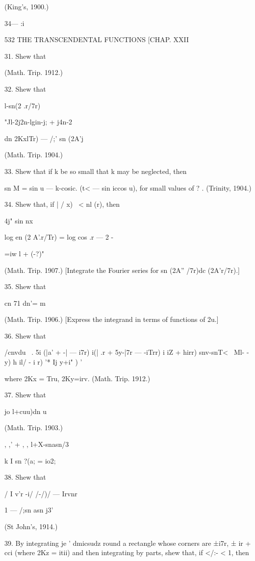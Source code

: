 (King's, 1900.)

34— :i



532 THE TRANSCENDENTAL FUNCTIONS [CHAP. XXII

31. Shew that

(Math. Trip. 1912.)

32. Shew that

l-sn(2 .r/7r)



"Jl-2j2n-lgin-j; + j4n-2



 dn 2KxlTr) — /;' sn (2A'j

(Math. Trip. 1904.)

33. Shew that if k be so small that k may be neglected, then

sn M = sin u — k-cosic. (t< — sin iccos u), for small values of ? .
(Trinity, 1904.)

34. Shew that, if | / x) \ < nl (r), then

4j" sin nx



log en (2 A'.r/Tr) = log cos .r — 2 -



 =iw l + (-?)"

(Math. Trip. 1907.) [Integrate the Fourier series for sn (2A'' /7r)dc
(2A'r/7r).]

35. Shew that

cn 71 dn'= m

(Math. Trip. 1906.) [Express the integrand in terms of functions of
2u.]

36. Shew that

/cnvdu \ . 5i (|a' + -| — i7r) i(| .r + 5y-|7r — -iTrr) i iZ + hirr)
snv-snT<~ Ml- - y) h il/ - i r) '* Ij y+i" ) '

where 2Kx = Tru, 2Ky=irv. (Math. Trip. 1912.)

37. Shew that

  jo l+cuu)dn u

(Math. Trip. 1903.)



, ,' + , , l+X-snasn/3

k I sn ?(a; = io2;



38. Shew that

/ I v'r -i/ /-/)/ — Irvnr

1 — /;sn asn j3'

(St John's, 1914.)

39. By integrating je ' dmicsudz round a rectangle whose corners are
±i7r, ± ir + cci (where 2Kz = itii) and then integrating by parts,
shew that, if </:- < 1, then

